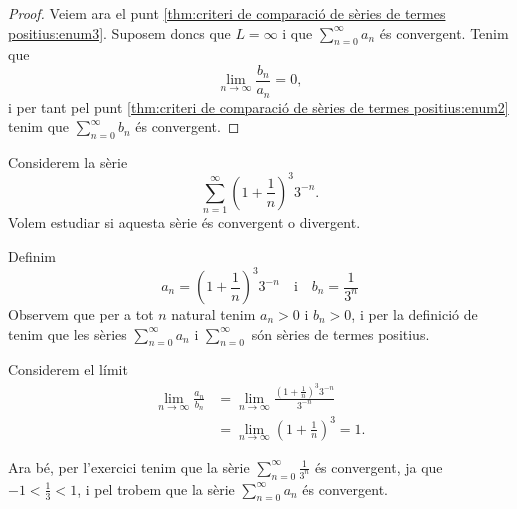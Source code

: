 \documentclass[../Apunts.tex]{subfiles}
\begin{document}
\begin{theorem}
\begin{proof}
			Veiem ara el punt \eqref{thm:criteri de comparació de sèries de termes positius:enum3}. Suposem doncs que \(L=\infty\) i que \(\sum_{n=0}^{\infty}a_{n}\) és convergent. Tenim que
			\[\lim_{n\to\infty}\frac{b_{n}}{a_{n}}=0,\] %
			i per tant pel punt \eqref{thm:criteri de comparació de sèries de termes positius:enum2} tenim que \(\sum_{n=0}^{\infty}b_{n}\) és convergent.
		\end{proof}
	\end{theorem}
	\begin{example}
		Considerem la sèrie
		\[\sum_{n=1}^{\infty}\left(1+\frac{1}{n}\right)^{3}3^{-n}.\]
		Volem estudiar si aquesta sèrie és convergent o divergent.
		\begin{solution}
			Definim
			\[a_{n}=\left(1+\frac{1}{n}\right)^{3}3^{-n}\quad\text{i}\quad b_{n}=\frac{1}{3^{n}}\]
			Observem que per a tot \(n\) natural tenim \(a_{n}>0\) i \(b_{n}>0\), i per la definició de  tenim que les sèries \(\sum_{n=0}^{\infty}a_{n}\) i \(\sum_{n=0}^{\infty}\) són sèries de termes positius.
			
			Considerem el límit
			\begin{align*}
				\lim_{n\to\infty}\frac{a_{n}}{b_{n}}&=\lim_{n\to\infty}\frac{\left(1+\frac{1}{n}\right)^{3}3^{-n}}{3^{-n}}\\
				&=\lim_{n\to\infty}\left(1+\frac{1}{n}\right)^{3}=1.
			\end{align*}
			
			Ara bé, per l'exercici  tenim que la sèrie \(\sum_{n=0}^{\infty}\frac{1}{3^{n}}\) és convergent, ja que \(-1<\frac{1}{3}<1\), i pel  trobem que la sèrie \(\sum_{n=0}^{\infty}a_{n}\) és convergent.
		\end{solution}
	\end{example}
\end{document}

